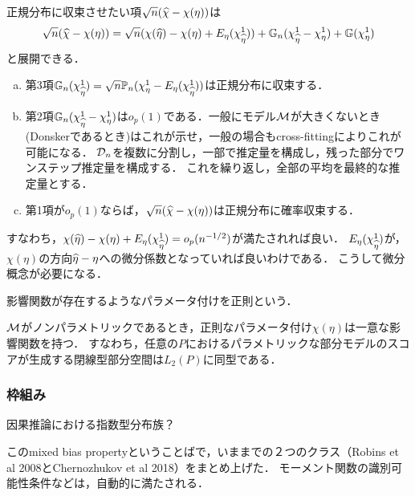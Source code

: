 \documentclass[uplatex,dvipdfmx]{jsreport}
\begin{document}
\begin{discussion}[影響関数を採用する動機]
    正規分布に収束させたい項$\sqrt{n}(\widehat{\chi}-\chi(\eta))$は
    \[\sqrt{n}(\widehat{\chi}-\chi(\eta))=\sqrt{n}(\chi(\widehat{\eta})-\chi(\eta)+E_\eta(\chi^1_{\widehat{\eta}}))+\mathbb{G}_n(\chi^1_{\widehat{\eta}}-\chi^1_\eta)+\mathbb{G}(\chi^1_\eta)\]
    と展開できる．
    \begin{enumerate}[(a)]
        \item 第3項$\mathbb{G}_n(\chi^1_{\widehat{\eta}})=\sqrt{n}\mathbb{P}_n(\chi^1_\eta-E_\eta(\chi^1_{\widehat{\eta}}))$は正規分布に収束する．
        \item 第2項$\mathbb{G}_n(\chi^1_{\widehat{\eta}}-\chi^1_\eta)$は$o_p(1)$である．一般にモデル$\mathcal{M}$が大きくないとき(Donskerであるとき)はこれが示せ，一般の場合もcross-fittingによりこれが可能になる．
        $\mathcal{D}_n$を複数に分割し，一部で推定量を構成し，残った部分でワンステップ推定量を構成する．
        これを繰り返し，全部の平均を最終的な推定量とする．
        \item 第1項が$o_p(1)$ならば，$\sqrt{n}(\widehat{\chi}-\chi(\eta))$は正規分布に確率収束する．
    \end{enumerate}
    すなわち，$\chi(\widehat{\eta})-\chi(\eta)+E_\eta(\chi^1_{\widehat{\eta}})=o_p(n^{-1/2})$が満たされれば良い．
    $E_\eta(\chi^1_{\widehat{\eta}})$が，$\chi(\eta)$の方向$\widehat{\eta}-\eta$への微分係数となっていれば良いわけである．
    こうして微分概念が必要になる．
\end{discussion}

\begin{definition}[正則パラメータ]
    影響関数が存在するようなパラメータ付けを正則という．
\end{definition}
\begin{lemma}
    $\mathcal{M}$がノンパラメトリックであるとき，正則なパラメータ付け$\chi(\eta)$は一意な影響関数を持つ．
    すなわち，任意の$P$におけるパラメトリックな部分モデルのスコアが生成する閉線型部分空間は$L_2(P)$に同型である．
\end{lemma}

\subsubsection{枠組み}

\begin{tcolorbox}[colframe=ForestGreen, colback=ForestGreen!10!white,breakable,colbacktitle=ForestGreen!40!white,coltitle=black,fonttitle=\bfseries\sffamily,
title=]
    因果推論における指数型分布族？

    このmixed bias propertyということばで，いままでの２つのクラス（Robins et al 2008とChernozhukov et al 2018）をまとめ上げた．
    モーメント関数の識別可能性条件などは，自動的に満たされる．
\end{tcolorbox}
\end{document}
